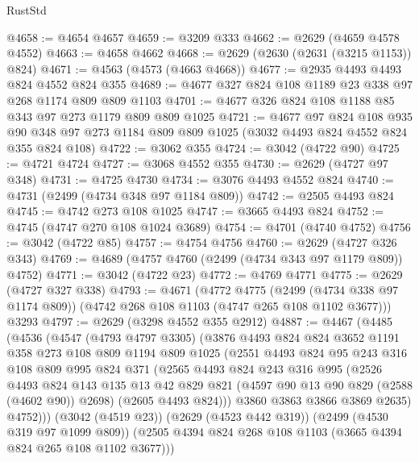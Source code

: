 \begin{lexlean}{RustStd}
\begin{coremodule}
@4658 := @4654 @4657
@4659 := @3209 @333
@4662 := @2629 (@4659 @4578 @4552)
@4663 := @4658 @4662
@4668 := @2629 (@2630 (@2631 (@3215 @1153)) @824)
@4671 := @4563 (@4573 (@4663 @4668))
@4677 := @2935 @4493 @4493 @824 @4552 @824 @355
@4689 := @4677 @327 @824 @108 @1189 @23 @338 @97 @268 @1174 @809 @809 @1103
@4701 := @4677 @326 @824 @108 @1188 @85 @343 @97 @273 @1179 @809 @809 @1025
@4721 := @4677
    @97
    @824
    @108
    @935
    @90
    @348
    @97
    @273
    @1184
    @809
    @809
    @1025
    (@3032 @4493 @824 @4552 @824 @355 @824 @108)
@4722 := @3062 @355
@4724 := @3042 (@4722 @90)
@4725 := @4721 @4724
@4727 := @3068 @4552 @355
@4730 := @2629 (@4727 @97 @348)
@4731 := @4725 @4730
@4734 := @3076 @4493 @4552 @824
@4740 := @4731 (@2499 (@4734 @348 @97 @1184 @809))
@4742 := @2505 @4493 @824
@4745 := @4742 @273 @108 @1025
@4747 := @3665 @4493 @824
@4752 := @4745 (@4747 @270 @108 @1024 @3689)
@4754 := @4701 (@4740 @4752)
@4756 := @3042 (@4722 @85)
@4757 := @4754 @4756
@4760 := @2629 (@4727 @326 @343)
@4769 := @4689 (@4757 @4760 (@2499 (@4734 @343 @97 @1179 @809)) @4752)
@4771 := @3042 (@4722 @23)
@4772 := @4769 @4771
@4775 := @2629 (@4727 @327 @338)
@4793 := @4671
    (@4772
      @4775
      (@2499 (@4734 @338 @97 @1174 @809))
      (@4742 @268 @108 @1103 (@4747 @265 @108 @1102 @3677)))
    @3293
@4797 := @2629 (@3298 @4552 @355 @2912)
@4887 := @4467
    (@4485
      (@4536
        (@4547
          (@4793 @4797 @3305)
          (@3876
            @4493
            @824
            @824
            @3652
            @1191
            @358
            @273
            @108
            @809
            @1194
            @809
            @1025
            (@2551
              @4493
              @824
              @95
              @243
              @316
              @108
              @809
              @995
              @824
              @371
              (@2565
                @4493
                @824
                @243
                @316
                @995
                (@2526
                  @4493
                  @824
                  @143
                  @135
                  @13
                  @42
                  @829
                  @821
                  (@4597 @90 @13 @90 @829 (@2588 (@4602 @90)) @2698)
                  (@2605 @4493 @824)))
              @3860
              @3863
              @3866
              @3869
              @2635)
            @4752)))
      (@3042 (@4519 @23))
      (@2629 (@4523 @442 @319))
      (@2499 (@4530 @319 @97 @1099 @809))
      (@2505 @4394 @824 @268 @108 @1103 (@3665 @4394 @824 @265 @108 @1102 @3677)))

\end{coremodule}
\end{lexlean}
